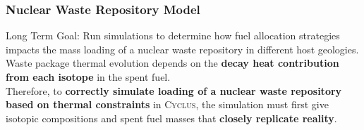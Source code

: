 \begin{frame}
    \frametitle{Nuclear Waste Repository Model}
          Long Term Goal: Run simulations to determine how fuel allocation strategies impacts the mass loading of a nuclear waste repository in different host geologies. 
          \\

          Waste package thermal evolution depends on the \textbf{decay heat contribution from each isotope} in the spent fuel. 
          \\
          
          Therefore, to \textbf{correctly simulate loading of a nuclear waste repository based on thermal constraints} in \textsc{Cyclus}, the simulation must first give isotopic compositions and spent fuel masses that \textbf{closely replicate reality}. 

  \end{frame}
  